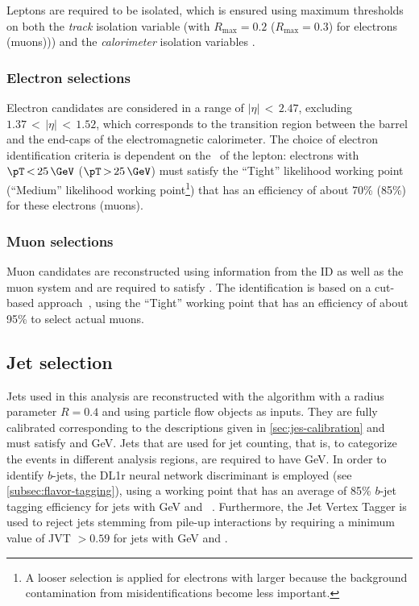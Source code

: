 Leptons are required to be isolated, which is ensured using maximum thresholds on both the \emph{track} isolation variable \pTvarcone (with $R_{\text{max}} = 0.2$ ($R_{\text{max}} = 0.3$) for electrons (muons))) and the \emph{calorimeter} isolation variables \ETconetwenty.

\subsubsection{Electron selections}
Electron candidates are considered in a range of $|\eta| \,{<}\, 2.47$, excluding $1.37\,{<}\,|\eta|\,{<}\,1.52$, which corresponds to the transition region between the barrel and the end-caps of the electromagnetic calorimeter.
The choice of electron identification criteria is dependent on the \pT\ of the lepton: electrons with $\pT \,{<}\,25\,\GeV$ ($\pT\,{>}\,25\,\GeV$) must satisfy the ``Tight'' likelihood working point (``Medium'' likelihood working point\footnote{A looser selection is applied for electrons with larger \pT because the background contamination from misidentifications become less important.}) that has an efficiency of about 70\% (85\%) for these electrons (muons).~\cite{EGAM-2018-01}

\subsubsection{Muon selections}
Muon candidates are reconstructed using information from the ID as well as the muon system and are required to satisfy .
The identification is based on a cut-based approach~\cite{MUON-2018-03}, using the ``Tight'' working point that has an efficiency of about 95\% to select actual muons.

\subsection{Jet selection}
Jets used in this analysis are reconstructed with the \antikt algorithm with a radius parameter $R = 0.4$ and using particle flow objects as inputs.
They are fully calibrated corresponding to the descriptions given in \cref{sec:jes-calibration} and must satisfy  and GeV.
Jets that are used for jet counting, that is, to categorize the events in different analysis regions, are required to have GeV.
In order to identify $b$-jets, the DL1r neural network discriminant is employed (see \cref{subsec:flavor-tagging}), using a working point that has an average of 85\% $b$-jet tagging efficiency for jets with GeV and ~\cite{FTAG-2018-01}.
Furthermore, the Jet Vertex Tagger is used to reject jets stemming from pile-up interactions by requiring a minimum value of JVT $> 0.59$ for jets with GeV and .



